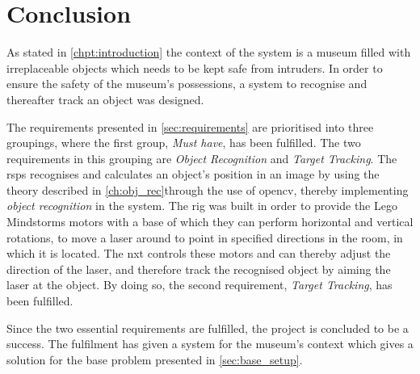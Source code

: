 \chapter{Conclusion}\label{chpt:conclusion}
As stated in \cref{chpt:introduction} the context of the system is a museum filled with irreplaceable objects which needs to be kept safe from intruders. 
In order to ensure the safety of the museum's possessions, a system to recognise and thereafter track an object was designed.

The requirements presented in \cref{sec:requirements} are prioritised into three groupings, where the first group, \textit{Must have}, has been fulfilled.
The two requirements in this grouping are \textit{Object Recognition} and \textit{Target Tracking}.
The \glspl{rsp} recognises and calculates an object's position in an image by using the theory described in \cref{ch:obj_rec}through the use of \gls{opencv}, thereby implementing \textit{object recognition} in the system.
The rig was built in order to provide the Lego Mindstorms motors with a base of which they can perform horizontal and vertical rotations, to move a laser around to point in specified directions in the room, in which it is located.
The \gls{nxt} controls these motors and can thereby adjust the direction of the laser, and therefore track the recognised object by aiming the laser at the object.
By doing so, the second requirement, \textit{Target Tracking}, has been fulfilled.

Since the two essential requirements are fulfilled, the project is concluded to be a success. The fulfilment has given a system for the museum's context which gives a solution for the base problem presented in \cref{sec:base_setup}.